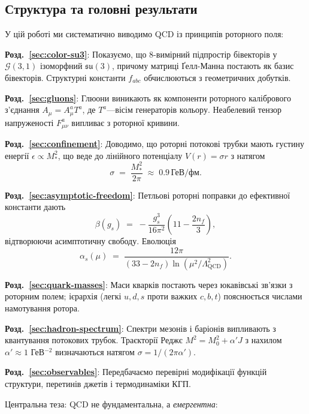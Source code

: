 \documentclass[11pt,a4paper]{article}
\newcommand{\Cl}{\mathcal{G}}
\theoremstyle{definition}
\theoremstyle{plain}
\theoremstyle{remark}
\begin{document}
\subsection{Структура та головні результати}

У цій роботі ми систематично виводимо QCD із принципів роторного поля:

\textbf{Розд.~\ref{sec:color-su3}}: Показуємо, що 8-вимірний підпростір бівекторів у $\Cl(3,1)$ ізоморфний $\mathfrak{su}(3)$, причому матриці Ґелл-Манна постають як базис бівекторів. Структурні константи $f_{abc}$ обчислюються з геометричних добутків.

\textbf{Розд.~\ref{sec:gluons}}: Глюони виникають як компоненти роторного калібрового з’єднання $A_\mu=A_\mu^aT^a$, де $T^a$—вісім генераторів кольору. Неабелевий тензор напруженості $F_{\mu\nu}^a$ випливає з роторної кривини.

\textbf{Розд.~\ref{sec:confinement}}: Доводимо, що роторні потокові трубки мають густину енергії $\epsilon\propto M_\ast^2$, що веде до лінійного потенціалу $V(r)=\sigma r$ з натягом
\begin{equation}
\sigma \;=\; \frac{M_\ast^2}{2\pi} \;\approx\; 0{.}9\,\text{ГеВ/фм}.
\end{equation}

\textbf{Розд.~\ref{sec:asymptotic-freedom}}: Петльові роторні поправки до ефективної константи дають
\begin{equation}
\beta(g_s) \;=\; -\frac{g_s^3}{16\pi^2}\left(11 - \frac{2n_f}{3}\right),
\end{equation}
відтворюючи асимптотичну свободу. Еволюція
\begin{equation}
\alpha_s(\mu) \;=\; \frac{12\pi}{(33 - 2n_f)\ln(\mu^2/\Lambda_{\mathrm{QCD}}^2)}.
\end{equation}

\textbf{Розд.~\ref{sec:quark-masses}}: Маси кварків постають через юкавівські зв’язки з роторним полем; ієрархія (легкі $u,d,s$ проти важких $c,b,t$) пояснюється числами намотування ротора.

\textbf{Розд.~\ref{sec:hadron-spectrum}}: Спектри мезонів і баріонів випливають з квантування потокових трубок. Траєкторії Реджє $M^2=M_0^2+\alpha' J$ з нахилом $\alpha'\approx 1$ ГеВ$^{-2}$ визначаються натягом $\sigma=1/(2\pi\alpha')$.

\textbf{Розд.~\ref{sec:observables}}: Передбачаємо перевірні модифікації функцій структури, перетинів джетів і термодинаміки КГП.

Центральна теза: QCD не фундаментальна, а \emph{емергентна}:
\end{document}
